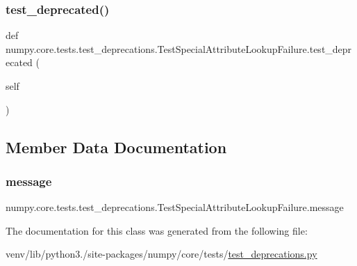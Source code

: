 \subsubsection{\texorpdfstring{test\+\_\+deprecated()}{test\_deprecated()}}
{\footnotesize\ttfamily def numpy.\+core.\+tests.\+test\+\_\+deprecations.\+Test\+Special\+Attribute\+Lookup\+Failure.\+test\+\_\+deprecated (\begin{DoxyParamCaption}\item[{}]{self }\end{DoxyParamCaption})}



\subsection{Member Data Documentation}
\mbox{\label{classnumpy_1_1core_1_1tests_1_1test__deprecations_1_1TestSpecialAttributeLookupFailure_ac36f42ee0d21f2072e578b47e9cfbe76}} 
\subsubsection{\texorpdfstring{message}{message}}
{\footnotesize\ttfamily numpy.\+core.\+tests.\+test\+\_\+deprecations.\+Test\+Special\+Attribute\+Lookup\+Failure.\+message\hspace{0.3cm}{\ttfamily [static]}}



The documentation for this class was generated from the following file\+:\begin{DoxyCompactItemize}
\item 
venv/lib/python3./site-\/packages/numpy/core/tests/\hyperlink{core_2tests_2test__deprecations_8py}{test\+\_\+deprecations.\+py}\end{DoxyCompactItemize}
